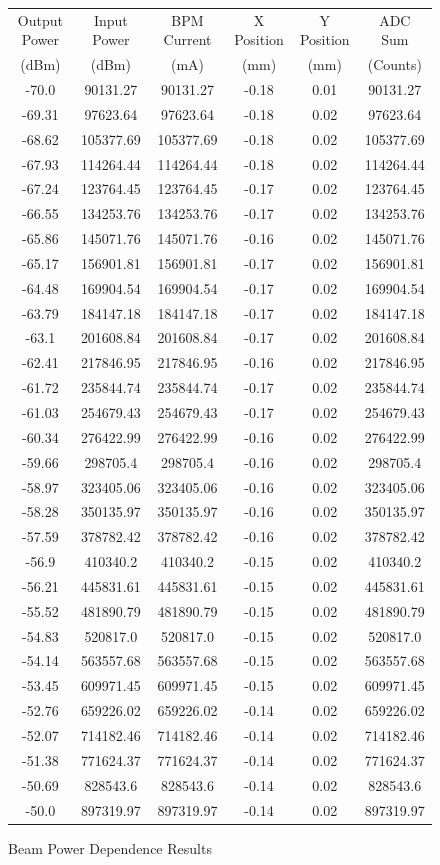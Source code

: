 \documentclass[a4paper, 11pt]{article}%
\begin{document}
%
\begin{figure}[htbp]%
\centering%
\caption{Beam Power Dependence Results}%
\begin{tabular}{|c|c|c|c|c|c|}%
\hline%
Output Power&Input Power&BPM Current&X Position&Y Position&ADC Sum\\%
(dBm)&(dBm)&(mA)&(mm)&(mm)&(Counts)\\%
\hline%
{-}70.0&90131.27&90131.27&{-}0.18&0.01&90131.27\\%
{-}69.31&97623.64&97623.64&{-}0.18&0.02&97623.64\\%
{-}68.62&105377.69&105377.69&{-}0.18&0.02&105377.69\\%
{-}67.93&114264.44&114264.44&{-}0.18&0.02&114264.44\\%
{-}67.24&123764.45&123764.45&{-}0.17&0.02&123764.45\\%
{-}66.55&134253.76&134253.76&{-}0.17&0.02&134253.76\\%
{-}65.86&145071.76&145071.76&{-}0.16&0.02&145071.76\\%
{-}65.17&156901.81&156901.81&{-}0.17&0.02&156901.81\\%
{-}64.48&169904.54&169904.54&{-}0.17&0.02&169904.54\\%
{-}63.79&184147.18&184147.18&{-}0.17&0.02&184147.18\\%
{-}63.1&201608.84&201608.84&{-}0.17&0.02&201608.84\\%
{-}62.41&217846.95&217846.95&{-}0.16&0.02&217846.95\\%
{-}61.72&235844.74&235844.74&{-}0.17&0.02&235844.74\\%
{-}61.03&254679.43&254679.43&{-}0.17&0.02&254679.43\\%
{-}60.34&276422.99&276422.99&{-}0.16&0.02&276422.99\\%
{-}59.66&298705.4&298705.4&{-}0.16&0.02&298705.4\\%
{-}58.97&323405.06&323405.06&{-}0.16&0.02&323405.06\\%
{-}58.28&350135.97&350135.97&{-}0.16&0.02&350135.97\\%
{-}57.59&378782.42&378782.42&{-}0.16&0.02&378782.42\\%
{-}56.9&410340.2&410340.2&{-}0.15&0.02&410340.2\\%
{-}56.21&445831.61&445831.61&{-}0.15&0.02&445831.61\\%
{-}55.52&481890.79&481890.79&{-}0.15&0.02&481890.79\\%
{-}54.83&520817.0&520817.0&{-}0.15&0.02&520817.0\\%
{-}54.14&563557.68&563557.68&{-}0.15&0.02&563557.68\\%
{-}53.45&609971.45&609971.45&{-}0.15&0.02&609971.45\\%
{-}52.76&659226.02&659226.02&{-}0.14&0.02&659226.02\\%
{-}52.07&714182.46&714182.46&{-}0.14&0.02&714182.46\\%
{-}51.38&771624.37&771624.37&{-}0.14&0.02&771624.37\\%
{-}50.69&828543.6&828543.6&{-}0.14&0.02&828543.6\\%
{-}50.0&897319.97&897319.97&{-}0.14&0.02&897319.97\\%
\hline%
\end{tabular}%
\end{figure}%
\end{document}
